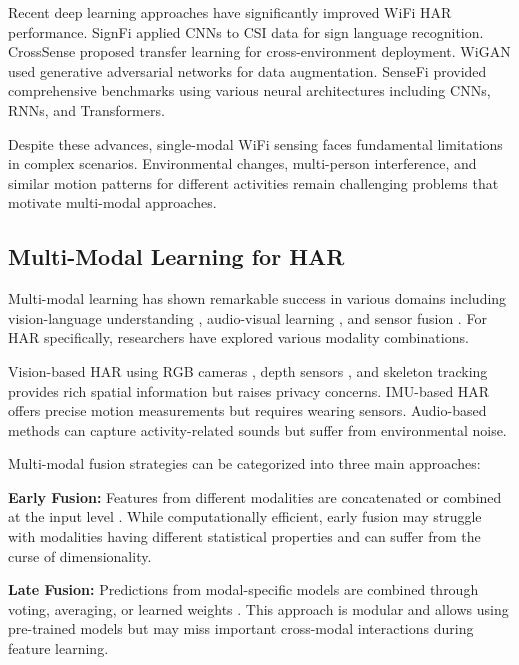 \documentclass[10pt,twocolumn]{article}
\begin{document}
Recent deep learning approaches have significantly improved WiFi HAR performance. SignFi \cite{ma2018signfi} applied CNNs to CSI data for sign language recognition. CrossSense \cite{zhang2018crosssense} proposed transfer learning for cross-environment deployment. WiGAN \cite{shi2021wigan} used generative adversarial networks for data augmentation. SenseFi \cite{yang2022sensefi} provided comprehensive benchmarks using various neural architectures including CNNs, RNNs, and Transformers.

Despite these advances, single-modal WiFi sensing faces fundamental limitations in complex scenarios. Environmental changes, multi-person interference, and similar motion patterns for different activities remain challenging problems that motivate multi-modal approaches.

\subsection{Multi-Modal Learning for HAR}

Multi-modal learning has shown remarkable success in various domains including vision-language understanding \cite{radford2021clip}, audio-visual learning \cite{arandjelovic2017look}, and sensor fusion \cite{chen2022deep}. For HAR specifically, researchers have explored various modality combinations.

Vision-based HAR using RGB cameras \cite{carreira2017quo}, depth sensors \cite{wang2019depth}, and skeleton tracking \cite{yan2018spatial} provides rich spatial information but raises privacy concerns. IMU-based HAR \cite{ordonez2016deep} offers precise motion measurements but requires wearing sensors. Audio-based methods \cite{chen2020acoustic} can capture activity-related sounds but suffer from environmental noise.

Multi-modal fusion strategies can be categorized into three main approaches:

\textbf{Early Fusion:} Features from different modalities are concatenated or combined at the input level \cite{simonyan2014two}. While computationally efficient, early fusion may struggle with modalities having different statistical properties and can suffer from the curse of dimensionality.

\textbf{Late Fusion:} Predictions from modal-specific models are combined through voting, averaging, or learned weights \cite{wang2020late}. This approach is modular and allows using pre-trained models but may miss important cross-modal interactions during feature learning.
\end{document}
